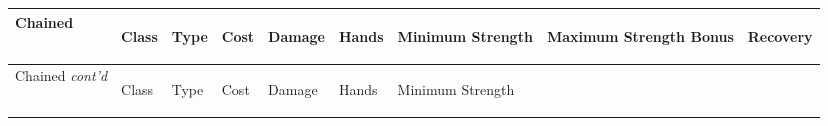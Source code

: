 \documentclass[twoside]{book}
\begin{document}
\begin{longtable}{p{1.25in}llllp{2em}p{3em}p{3em}l} 
  Chained
  &
  \begin{turn}{70}{Class}\end{turn}
          
  &
  \begin{turn}{70}{Type}\end{turn}
          
  &
  \begin{turn}{70}{Cost}\end{turn}
          
  &
  \begin{turn}{70}{Damage}\end{turn}
          
  &
  \begin{turn}{70}{Hands}\end{turn}
          
  &
  \begin{turn}{70}{Minimum Strength}\end{turn}
          
  &
  \begin{turn}{70}{Maximum Strength Bonus}\end{turn}
          
  &
  \begin{turn}{70}{Recovery}\end{turn}
          
  \\
  \hline
  \hline
  \endfirsthead
  Chained \textit{cont'd}
        
  &
  \begin{turn}{70}{Class}\end{turn}
          
  &
  \begin{turn}{70}{Type}\end{turn}
          
  &
  \begin{turn}{70}{Cost}\end{turn}
          
  &
  \begin{turn}{70}{Damage}\end{turn}
          
  &
  \begin{turn}{70}{Hands}\end{turn}
          
  &
  \begin{turn}{70}{Minimum Strength}\end{turn}
          

\end{longtable}
\end{document}
